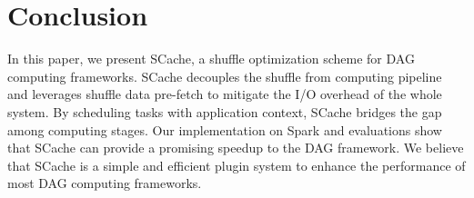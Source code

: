 \section{Conclusion}
 In this paper, we present SCache, a shuffle optimization scheme for DAG computing frameworks. SCache decouples the shuffle from computing pipeline and leverages shuffle data pre-fetch to mitigate the I/O overhead of the whole system. By scheduling tasks with application context, SCache bridges the gap among computing stages. Our implementation on Spark and evaluations show that SCache can provide a promising speedup to the DAG framework. We believe that SCache is a simple and efficient plugin system to enhance the performance of most DAG computing frameworks. 